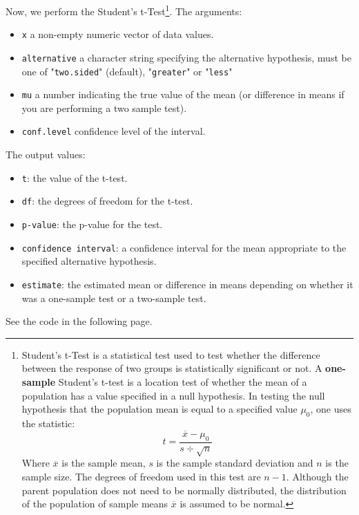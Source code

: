 \documentclass[a4paper]{article}
\newcommand{\highspace}{\vspace{1.2em}\noindent}
\begin{document}
    \highspace
    Now, we perform the Student's t-Test\footnote{Student's t-Test is a statistical test used to test whether the difference between the response of two groups is statistically significant or not. A \textbf{one-sample} Student's t-test is a location test of whether the mean of a population has a value specified in a null hypothesis. In testing the null hypothesis that the population mean is equal to a specified value $\mu_{0}$, one uses the statistic:
    \begin{equation*}
        t = \dfrac{\overline{x}-\mu_{0}}{s \div \sqrt{n}}
    \end{equation*}
    Where $\overline{x}$ is the sample mean, $s$ is the sample standard deviation and $n$ is the sample size. The degrees of freedom used in this test are $n-1$. Although the parent population does not need to be normally distributed, the distribution of the population of sample means $\overline{x}$ is assumed to be normal.}. The arguments:
    \begin{itemize}
        \item \texttt{x} a non-empty numeric vector of data values.
        
        \item \texttt{alternative} a character string specifying the alternative hypothesis, must be one of "\texttt{two.sided}" (default), "\texttt{greater}" or "\texttt{less}"

        \item \texttt{mu} a number indicating the true value of the mean (or difference in means if you are performing a two sample test).
        
        \item \texttt{conf.level} confidence level of the interval.
    \end{itemize}
    The output values:
    \begin{itemize}
        \item \texttt{t}: the value of the t-test.

        \item \texttt{df}: the degrees of freedom for the t-test.

        \item \texttt{p-value}: the p-value for the test.

        \item \texttt{confidence interval}: a confidence interval for the mean appropriate to the specified alternative hypothesis.

        \item \texttt{estimate}: the estimated mean or difference in means depending on whether it was a one-sample test or a two-sample test.
    \end{itemize}
    See the code in the following page.
\end{document}
